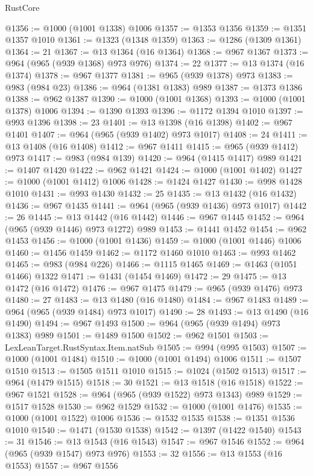 \begin{lexlean}{RustCore}
\begin{coremodule}
@1356 := @1000 (@1001 @1338) @1006
@1357 := @1353 @1356
@1359 := @1351 @1357 @1010
@1361 := @1323 (@1348 @1359)
@1363 := @1286 (@1309 @1361)
@1364 := 21
@1367 := @13 @1364 (@16 @1364)
@1368 := @967 @1367
@1373 := @964 (@965 (@939 @1368) @973 @976)
@1374 := 22
@1377 := @13 @1374 (@16 @1374)
@1378 := @967 @1377
@1381 := @965 (@939 @1378) @973
@1383 := @983 (@984 @23)
@1386 := @964 (@1381 @1383) @989
@1387 := @1373 @1386
@1388 := @962 @1387
@1390 := @1000 (@1001 @1368)
@1393 := @1000 (@1001 @1378) @1006
@1394 := @1390 @1393
@1396 := @1172 @1394 @1010
@1397 := @993 @1396
@1398 := 23
@1401 := @13 @1398 (@16 @1398)
@1402 := @967 @1401
@1407 := @964 (@965 (@939 @1402) @973 @1017)
@1408 := 24
@1411 := @13 @1408 (@16 @1408)
@1412 := @967 @1411
@1415 := @965 (@939 @1412) @973
@1417 := @983 (@984 @139)
@1420 := @964 (@1415 @1417) @989
@1421 := @1407 @1420
@1422 := @962 @1421
@1424 := @1000 (@1001 @1402)
@1427 := @1000 (@1001 @1412) @1006
@1428 := @1424 @1427
@1430 := @998 @1428 @1010
@1431 := @993 @1430
@1432 := 25
@1435 := @13 @1432 (@16 @1432)
@1436 := @967 @1435
@1441 := @964 (@965 (@939 @1436) @973 @1017)
@1442 := 26
@1445 := @13 @1442 (@16 @1442)
@1446 := @967 @1445
@1452 := @964 (@965 (@939 @1446) @973 @1272) @989
@1453 := @1441 @1452
@1454 := @962 @1453
@1456 := @1000 (@1001 @1436)
@1459 := @1000 (@1001 @1446) @1006
@1460 := @1456 @1459
@1462 := @1172 @1460 @1010
@1463 := @993 @1462
@1465 := @983 (@984 @226)
@1466 := @1115 @1465
@1469 := @1463 (@1051 @1466) @1322
@1471 := @1431 (@1454 @1469)
@1472 := 29
@1475 := @13 @1472 (@16 @1472)
@1476 := @967 @1475
@1479 := @965 (@939 @1476) @973
@1480 := 27
@1483 := @13 @1480 (@16 @1480)
@1484 := @967 @1483
@1489 := @964 (@965 (@939 @1484) @973 @1017)
@1490 := 28
@1493 := @13 @1490 (@16 @1490)
@1494 := @967 @1493
@1500 := @964 (@965 (@939 @1494) @973 @1383) @989
@1501 := @1489 @1500
@1502 := @962 @1501
@1503 := LexLeanTarget.RustSyntax.Item.natSub
@1505 := @994 (@995 @1503)
@1507 := @1000 (@1001 @1484)
@1510 := @1000 (@1001 @1494) @1006
@1511 := @1507 @1510
@1513 := @1505 @1511 @1010
@1515 := @1024 (@1502 @1513)
@1517 := @964 (@1479 @1515)
@1518 := 30
@1521 := @13 @1518 (@16 @1518)
@1522 := @967 @1521
@1528 := @964 (@965 (@939 @1522) @973 @1343) @989
@1529 := @1517 @1528
@1530 := @962 @1529
@1532 := @1000 (@1001 @1476)
@1535 := @1000 (@1001 @1522) @1006
@1536 := @1532 @1535
@1538 := @1351 @1536 @1010
@1540 := @1471 (@1530 @1538)
@1542 := @1397 (@1422 @1540)
@1543 := 31
@1546 := @13 @1543 (@16 @1543)
@1547 := @967 @1546
@1552 := @964 (@965 (@939 @1547) @973 @976)
@1553 := 32
@1556 := @13 @1553 (@16 @1553)
@1557 := @967 @1556

\end{coremodule}
\end{lexlean}
